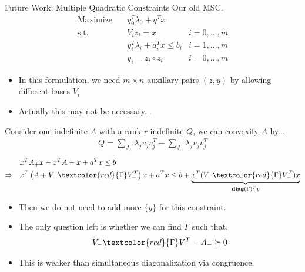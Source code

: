 \documentclass[aspectratio=1610, 10pt]{beamer}
\newcommand{\diag}{\mathbf{diag}}
\newcommand{\red}[1]{\textcolor{red}{#1}}
\begin{document}
\begin{frame}[allowframebreaks]{Future Work: Multiple Quadratic Constraints}
  Our old MSC.
  \begin{align}
    \nonumber \mathrm{Maximize}\quad & y_0 ^T\lambda_0 + q^Tx                         \\
    \mathrm{s.t.} \quad              & V_i z_i = x                        & i=0,...,m \\
                                     & y_i ^T\lambda_i  + a_i^Tx  \le b_i & i=1,...,m \\
    \label{quad}                     & y_i = z_i \circ z_i                & i=0,...,m
  \end{align}
  \begin{itemize}
    \item In this formulation, we need \(m \times n\) auxillary pairs \((z, y)\) by allowing different bases \(V_i\)
    \item Actually this may not be necessary...
  \end{itemize}

  \framebreak
  Consider one indefinite \(A\) with a rank-\(r\) indefinite \(Q\), we can convexify \(A\) by\dots
  \begin{align*}
    Q = \sum_{J_+} \lambda_j v_jv_j^T - \sum_{J_-} \lambda_j v_jv_j^T
  \end{align*}
  \begin{eqnarray}
    & x^TA_+ x - x^TA-x + a^Tx \le b \\
    \Rightarrow \quad & x^T\left(A + V_-\red{\Gamma}V^T_-\right )x +a^Tx \le b + \underbrace{x^T(V_-\red{\Gamma}V^T_-)x}_{\diag(\Gamma)^Ty}
  \end{eqnarray}
  \begin{itemize}
    \item Then we do not need to add more \(\{y\}\) for this constraint.
    \item The only question left is whether we can find \(\Gamma\) such that,
          \begin{equation}
            V_-\red{\Gamma}V^T_- - A_- \succeq 0
          \end{equation}
    \item This is weaker than simultaneous diagonalization via congruence.
  \end{itemize}
\end{frame}
\end{document}
